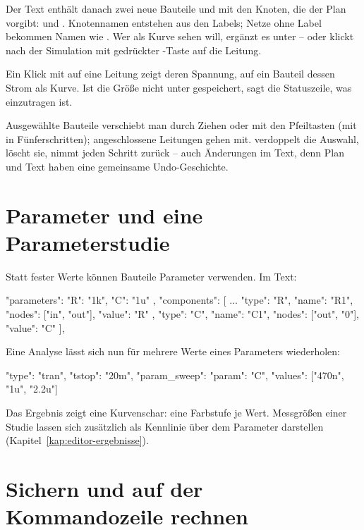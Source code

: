 Der Text enthält danach zwei neue Bauteile  und  mit den
Knoten, die der Plan vorgibt:  und
\code{["out2", "0"]}. Knotennamen entstehen aus den Labels; Netze ohne Label
bekommen Namen wie . Wer  als Kurve sehen will,
ergänzt es unter  – oder klickt nach der Simulation mit
gedrückter -Taste auf die Leitung.

\begin{hinweis}
  Ein Klick mit  auf eine Leitung zeigt deren Spannung, auf ein
  Bauteil dessen Strom als Kurve. Ist die Größe nicht unter
   gespeichert, sagt die Statuszeile, was einzutragen ist.
\end{hinweis}

Ausgewählte Bauteile verschiebt man durch Ziehen oder mit den Pfeiltasten
(mit  in Fünferschritten); angeschlossene Leitungen gehen
mit.  verdoppelt die Auswahl,  löscht sie,
 nimmt jeden Schritt zurück – auch Änderungen im Text,
denn Plan und Text haben eine gemeinsame Undo-Geschichte.

\section{Parameter und eine Parameterstudie}

Statt fester Werte können Bauteile Parameter verwenden. Im Text:

\begin{json}
"parameters": { "R": "1k", "C": "1u" },
"components": [
  ...
  { "type": "R", "name": "R1", "nodes": ["in", "out"], "value": "R" },
  { "type": "C", "name": "C1", "nodes": ["out", "0"], "value": "C" }
],
\end{json}

Eine Analyse lässt sich nun für mehrere Werte eines Parameters wiederholen:

\begin{json}
{ "type": "tran", "tstop": "20m",
  "param_sweep": { "param": "C", "values": ["470n", "1u", "2.2u"] } }
\end{json}

Das Ergebnis zeigt eine Kurvenschar: eine Farbstufe je Wert. Messgrößen
einer Studie lassen sich zusätzlich als Kennlinie über dem Parameter
darstellen (Kapitel~\ref{kap:editor-ergebnisse}).

\section{Sichern und auf der Kommandozeile rechnen}


